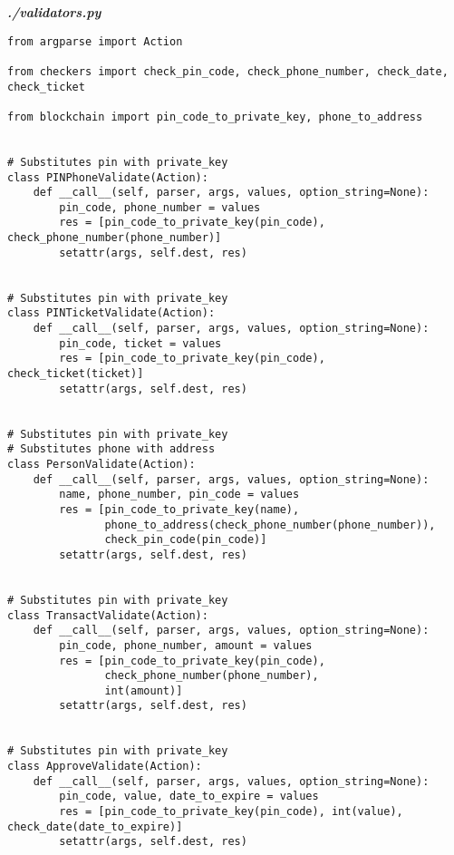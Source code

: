 \textit{\textbf{./validators.py}}
\begin{verbatim}
from argparse import Action

from checkers import check_pin_code, check_phone_number, check_date, check_ticket

from blockchain import pin_code_to_private_key, phone_to_address


# Substitutes pin with private_key
class PINPhoneValidate(Action):
    def __call__(self, parser, args, values, option_string=None):
        pin_code, phone_number = values
        res = [pin_code_to_private_key(pin_code), check_phone_number(phone_number)]
        setattr(args, self.dest, res)


# Substitutes pin with private_key
class PINTicketValidate(Action):
    def __call__(self, parser, args, values, option_string=None):
        pin_code, ticket = values
        res = [pin_code_to_private_key(pin_code), check_ticket(ticket)]
        setattr(args, self.dest, res)


# Substitutes pin with private_key
# Substitutes phone with address
class PersonValidate(Action):
    def __call__(self, parser, args, values, option_string=None):
        name, phone_number, pin_code = values
        res = [pin_code_to_private_key(name),
               phone_to_address(check_phone_number(phone_number)),
               check_pin_code(pin_code)]
        setattr(args, self.dest, res)


# Substitutes pin with private_key
class TransactValidate(Action):
    def __call__(self, parser, args, values, option_string=None):
        pin_code, phone_number, amount = values
        res = [pin_code_to_private_key(pin_code),
               check_phone_number(phone_number),
               int(amount)]
        setattr(args, self.dest, res)


# Substitutes pin with private_key
class ApproveValidate(Action):
    def __call__(self, parser, args, values, option_string=None):
        pin_code, value, date_to_expire = values
        res = [pin_code_to_private_key(pin_code), int(value), check_date(date_to_expire)]
        setattr(args, self.dest, res)
\end{verbatim}

